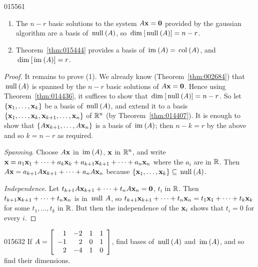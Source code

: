 {{\begin{theorem}{}{015561}
\begin{enumerate}
\item The $n - r$ basic solutions to the system $A\textbf{x} = \textbf{0}$ provided by the gaussian algorithm are a basis of $\thinspace\operatorname{null\medspace}(A)$, so $\thinspace\operatorname{dim\medspace}[\thinspace\operatorname{null\medspace}(A)] = n - r$.

\item Theorem~\ref{thm:015444} provides a basis of $\thinspace\operatorname{im\medspace}(A) = \thinspace\operatorname{col\medspace}(A)$, and $\thinspace\operatorname{dim\medspace}[\thinspace\operatorname{im\medspace}(A)] = r$.

\end{enumerate}
\end{theorem}

\begin{proof}
It remains to prove (1). We already know (Theorem~\ref{thm:002684}) that $\thinspace\operatorname{null\medspace}(A)$ is spanned by the $n - r$ basic solutions of $A\textbf{x} = \textbf{0}$. Hence using Theorem~\ref{thm:014436}, it suffices to show that $\thinspace\operatorname{dim\medspace}[\thinspace\operatorname{null\medspace}(A)] = n - r$. So let $\{\textbf{x}_{1}, \dots, \textbf{x}_{k}\}$ be a basis of $\thinspace\operatorname{null\medspace}(A)$, and extend it to a basis $\{\textbf{x}_{1}, \dots, \textbf{x}_{k}, \textbf{x}_{k+1}, \dots, \textbf{x}_{n}\}$ of $\mathbb{R}^n$ (by Theorem~\ref{thm:014407}). It is enough to show that $\{A\textbf{x}_{k+1}, \dots, A\textbf{x}_{n}\}$ is a basis of $\thinspace\operatorname{im\medspace}(A)$; then $n - k = r$ by the above and so $k = n - r$ as required.

\textit{Spanning}. Choose $A\textbf{x}$ in $\thinspace\operatorname{im\medspace}(A)$, $\textbf{x}$ in
$\mathbb{R}^n$, and write $\textbf{x} = a_{1}\textbf{x}_{1} + \dots + a_{k}\textbf{x}_{k} + a_{k+1}\textbf{x}_{k+1} + \dots + a_{n}\textbf{x}_{n}$ where the $a_{i}$ are in $\mathbb{R}$.
Then $A\textbf{x} = a_{k+1}A\textbf{x}_{k+1} + \dots + a_{n}A\textbf{x}_{n}$ because $\{\textbf{x}_{1}, \dots, \textbf{x}_{k}\} \subseteq \thinspace\operatorname{null\medspace}(A)$.

\textit{Independence}. Let $t_{k+1}A\textbf{x}_{k+1} + \dots + t_{n}A\textbf{x}_{n} = \textbf{0}$, $t_{i}$ in $\mathbb{R}$. Then $t_{k+1}\textbf{x}_{k+1} + \dots + t_{n}\textbf{x}_{n}$ is in $\thinspace\operatorname{null\medspace} A$, so $t_{k+1}\textbf{x}_{k+1} + \dots + t_{n}\textbf{x}_{n} = t_{1}\textbf{x}_{1} + \dots + t_{k}\textbf{x}_{k}$ for some $t_{1}, \dots, t_{k}$ in $\mathbb{R}$. But then the independence of the $\textbf{x}_{i}$ shows that $t_{i} = 0$ for every $i$.
\end{proof}

\begin{example}{}{015632}
If $A = 
\left[ \begin{array}{rrrr}
1 & -2 & 1 & 1 \\
-1 & 2 & 0 & 1 \\
2 & -4 & 1 & 0
\end{array} \right]$, find bases of $\thinspace\operatorname{null\medspace}(A)$ and $\thinspace\operatorname{im\medspace}(A)$, and so find their dimensions.


\end{example}}}
